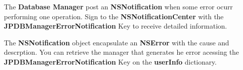 The {\bfseries Database Manager} post an {\bfseries NSNotification} when some error ocurr performing one operation. Sign to the {\bfseries NSNotificationCenter} with the {\bfseries JPDBManagerErrorNotification} Key to receive detailed information.\par
 \par
 The {\bfseries NSNotification} object encapsulate an {\bfseries NSError} with the cause and descrption. You can retrieve the manager that generates he error acessing the {\bfseries JPDBManagerErrorNotification} Key on the {\bfseries userInfo} dictionary. 